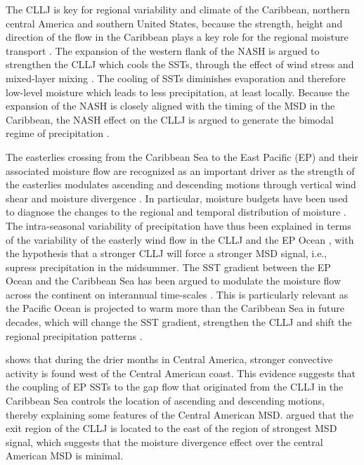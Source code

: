  The CLLJ is key for regional variability and climate of the Caribbean, northern central America and southern United States, because the strength, height and direction of the flow in the Caribbean plays a key role for the regional moisture transport \citep{giannini2000,martinez2019,garcia2020sub}. 
 The expansion of the western flank of the NASH is argued to strengthen the CLLJ which cools the SSTs, through the effect of wind stress and mixed-layer mixing \citep{gamble2008,martinez2019}.
The cooling of SSTs diminishes evaporation and therefore low-level moisture which leads to less precipitation, at least locally. Because the expansion of the NASH is closely aligned with the timing of the MSD in the Caribbean, the NASH effect on the CLLJ is argued to generate the bimodal regime of precipitation \citep{gamble2008,martinez2019}.  
 
    
The easterlies crossing from the Caribbean Sea to the East Pacific (EP) and their associated moisture flow are recognized as an important driver as the strength of the easterlies modulates ascending and descending motions through vertical wind shear and moisture divergence \citep{herrera2015,corrales2020,zhao2020}. In particular, moisture budgets have been used to diagnose the changes to the regional and temporal distribution of moisture \citep{martinez2019}. The intra-seasonal variability of precipitation have thus been explained in terms of the variability of the easterly wind flow in the CLLJ and the EP Ocean \citep{herrera2015,martinez2019,zhao2020}, with the hypothesis that a stronger CLLJ will force a stronger MSD signal, i.e., supress precipitation in the midsummer. The SST gradient between the EP Ocean and the Caribbean Sea has been argued to modulate the moisture flow across the continent on interannual time-scales \citep{martinez2020}. This is particularly relevant as the Pacific Ocean is projected to warm more than the Caribbean Sea in future decades, which will change the SST gradient, strengthen the CLLJ and shift the regional precipitation patterns \citep{corrales2020}.
    
 \cite{herrera2015} shows that during the drier months in Central America, stronger convective activity is found west of the Central American coast.  This evidence suggests that the coupling of EP SSTs to the gap flow that originated from the CLLJ in the Caribbean Sea controls the location of ascending and descending motions, thereby explaining some features of the Central American MSD. 
\cite{herrera2015} argued that the exit region of the CLLJ is located to the east of the region of strongest MSD signal, which suggests that the moisture divergence effect over the central American MSD is minimal. 



